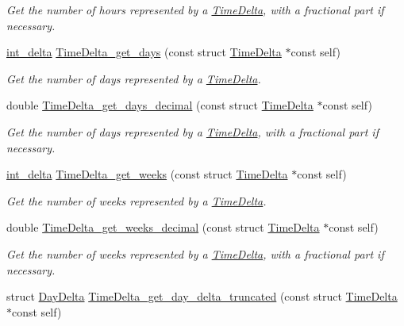 \begin{DoxyCompactItemize}
\begin{DoxyCompactList}\small\item\em \-Get the number of hours represented by a \hyperlink{structTimeDelta}{\-Time\-Delta}, with a fractional part if necessary. \end{DoxyCompactList}\item 
\hyperlink{types_8h_a10729255b1946fd4fb654b2fe814910b}{int\-\_\-delta} \hyperlink{time-delta_8h_a8394c0ca6720f02f68004e69be2a140b}{\-Time\-Delta\-\_\-get\-\_\-days} (const struct \hyperlink{structTimeDelta}{\-Time\-Delta} $\ast$const self)
\begin{DoxyCompactList}\small\item\em \-Get the number of days represented by a \hyperlink{structTimeDelta}{\-Time\-Delta}. \end{DoxyCompactList}\item 
double \hyperlink{time-delta_8h_a1cd230549ae6fbd0329212e2da4f3477}{\-Time\-Delta\-\_\-get\-\_\-days\-\_\-decimal} (const struct \hyperlink{structTimeDelta}{\-Time\-Delta} $\ast$const self)
\begin{DoxyCompactList}\small\item\em \-Get the number of days represented by a \hyperlink{structTimeDelta}{\-Time\-Delta}, with a fractional part if necessary. \end{DoxyCompactList}\item 
\hyperlink{types_8h_a10729255b1946fd4fb654b2fe814910b}{int\-\_\-delta} \hyperlink{time-delta_8h_ac0d5f3dc0f6ce1d76c9addf0ef23a01f}{\-Time\-Delta\-\_\-get\-\_\-weeks} (const struct \hyperlink{structTimeDelta}{\-Time\-Delta} $\ast$const self)
\begin{DoxyCompactList}\small\item\em \-Get the number of weeks represented by a \hyperlink{structTimeDelta}{\-Time\-Delta}. \end{DoxyCompactList}\item 
double \hyperlink{time-delta_8h_a17b67c52a855f556cb84371f83ade7cf}{\-Time\-Delta\-\_\-get\-\_\-weeks\-\_\-decimal} (const struct \hyperlink{structTimeDelta}{\-Time\-Delta} $\ast$const self)
\begin{DoxyCompactList}\small\item\em \-Get the number of weeks represented by a \hyperlink{structTimeDelta}{\-Time\-Delta}, with a fractional part if necessary. \end{DoxyCompactList}\item 
struct \hyperlink{structDayDelta}{\-Day\-Delta} \hyperlink{time-delta_8h_a22e42b82fef74a330b892197c3fe4586}{\-Time\-Delta\-\_\-get\-\_\-day\-\_\-delta\-\_\-truncated} (const struct \hyperlink{structTimeDelta}{\-Time\-Delta} $\ast$const self)

\end{DoxyCompactItemize}
